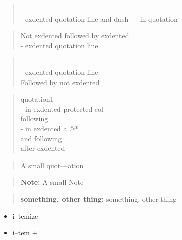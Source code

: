 \documentclass{book}
\begin{document}
\begin{quote}
\\
\hbox{\kern -\leftmargin}%
exdented quotation line   and dash --- in quotation
\\
\end{quote}

\begin{quote}
Not exdented followed by exdented
\\
\hbox{\kern -\leftmargin}%
exdented quotation line
\\
\end{quote}

\begin{quote}
\\
\hbox{\kern -\leftmargin}%
exdented quotation line
\\
Followed by not exdented 
\end{quote}

\begin{quote}
quotation1
\\
\hbox{\kern -\leftmargin}%
in exdented protected eol \ {}
\\
following
\\
\hbox{\kern -\leftmargin}%
in exdented a @* \leavevmode{}\\ and following
\\
after exdented
\end{quote}

\begin{quote}
\begin{footnotesize}
A small quot---ation
\end{footnotesize}
\end{quote}

\begin{quote}
\begin{footnotesize}
\textbf{Note:} A small Note
\end{footnotesize}
\end{quote}

\begin{quote}
\begin{footnotesize}
\textbf{something, other thing:} something, other thing
\end{footnotesize}
\end{quote}

\begin{itemize}
\item i--temize
\end{itemize}

\begin{itemize}[label=+]
\item i--tem +
\end{itemize}
\end{document}
